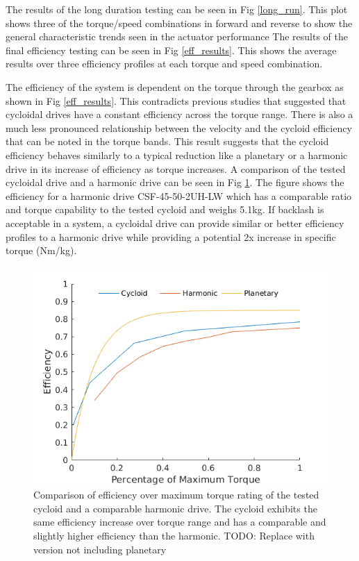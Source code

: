 
The results of the long duration testing can be seen in Fig \ref{long_run}. This plot shows three of the torque/speed combinations in forward and reverse to show the general characteristic trends seen in the actuator performance
The results of the final efficiency testing can be seen in Fig \ref{eff_results}. This shows the average results over three efficiency profiles at each torque and speed combination.

The efficiency of the system is dependent on the torque through the gearbox as shown in Fig \ref{eff_results}.
This contradicts previous studies that suggested that cycloidal drives have a constant efficiency across the torque range.
There is also a much less pronounced relationship between the velocity and the cycloid efficiency that can be noted in the torque bands.
This result suggests that the cycloid efficiency behaves similarly to a typical reduction like a planetary or a harmonic drive in its increase of efficiency as torque increases. 
A comparison of the tested cycloidal drive and a harmonic drive can be seen in Fig \ref{eff_comp}.
The figure shows the efficiency for a harmonic drive CSF-45-50-2UH-LW \cite{harmonic_sheet} which has a comparable ratio and torque capability to the tested cycloid and weighs 5.1kg.
If backlash is acceptable in a system, a cycloidal drive can provide similar or better efficiency profiles to a harmonic drive while providing a potential 2x increase in specific torque (Nm/kg).

\begin{figure}[t]
   \centering
   \includegraphics[width=\linewidth]{images/eff_comp_v3}
   \caption{Comparison of efficiency over maximum torque rating of the tested cycloid and a comparable harmonic drive.
   The cycloid exhibits the same efficiency increase over torque range and has a comparable and slightly higher efficiency than the harmonic. TODO: Replace with version not including planetary}
   \label{eff_comp}
\end{figure}

